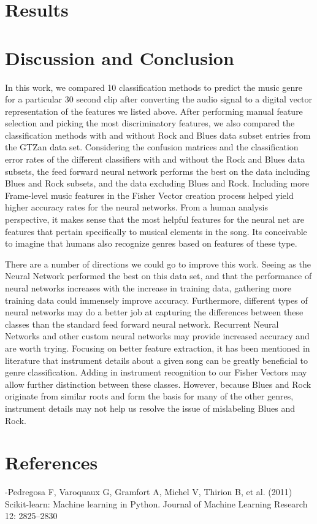 \documentclass{article}
\begin{document}
\begin{multicols}{2}
\section{Results}

\section{Discussion and Conclusion}
In this work, we compared 10 classification methods to predict the music genre for a particular 30 second clip after converting the audio signal to a digital vector representation of the features we listed above. After performing manual feature selection and picking the most discriminatory features, we also compared the classification methods with and without Rock and Blues data subset entries from the GTZan data set. Considering the confusion matrices and the classification error rates of the different classifiers with and without the Rock and Blues data subsets, the feed forward neural network performs the best on the data including Blues and Rock subsets, and the data excluding Blues and Rock. Including more Frame-level music features in the Fisher Vector creation process helped yield higher accuracy rates for the neural networks. From a human analysis perspective, it makes sense that the most helpful features for the neural net are features that pertain specifically to musical elements in the song. Its conceivable to imagine that humans also recognize genres based on features of these type.

There are a number of directions we could go to improve this work. Seeing as the Neural Network performed the best on this data set, and that the performance of neural networks increases with the increase in training data, gathering more training data could immensely improve accuracy. Furthermore, different types of neural networks may do a better job at capturing the differences between these classes than the standard feed forward neural network. Recurrent Neural Networks and other custom neural networks may provide increased accuracy and are worth trying. Focusing on better feature extraction, it has been mentioned in literature that instrument details about a given song can be greatly beneficial to genre classification. Adding in instrument recognition to our Fisher Vectors may allow further distinction between these classes. However, because Blues and Rock originate from similar roots and form the basis for many of the other genres, instrument details may not help us resolve the issue of mislabeling Blues and Rock.

\section{References}
-Pedregosa F, Varoquaux G, Gramfort A, Michel V, Thirion B, et al. (2011) Scikit-learn: Machine
learning in Python. Journal of Machine Learning Research 12: 2825–2830

\end{multicols}
\end{document}
